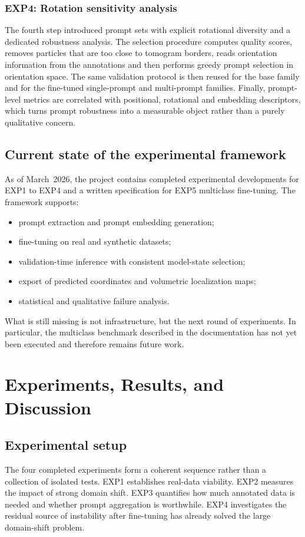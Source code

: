 \documentclass[12pt,a4paper]{report}
\begin{document}
\subsection{EXP4: Rotation sensitivity analysis}
The fourth step introduced prompt sets with explicit rotational diversity and a dedicated robustness analysis. The selection procedure computes quality scores, removes particles that are too close to tomogram borders, reads orientation information from the annotations and then performs greedy prompt selection in orientation space. The same validation protocol is then reused for the base family and for the fine-tuned single-prompt and multi-prompt families. Finally, prompt-level metrics are correlated with positional, rotational and embedding descriptors, which turns prompt robustness into a measurable object rather than a purely qualitative concern.

\section{Current state of the experimental framework}
As of March~2026, the project contains completed experimental developments for EXP1 to EXP4 and a written specification for EXP5 multiclass fine-tuning. The framework supports:
\begin{itemize}
  \item prompt extraction and prompt embedding generation;
  \item fine-tuning on real and synthetic datasets;
  \item validation-time inference with consistent model-state selection;
  \item export of predicted coordinates and volumetric localization maps;
  \item statistical and qualitative failure analysis.
\end{itemize}

What is still missing is not infrastructure, but the next round of experiments. In particular, the multiclass benchmark described in the documentation has not yet been executed and therefore remains future work.

\chapter{Experiments, Results, and Discussion}

\section{Experimental setup}
The four completed experiments form a coherent sequence rather than a collection of isolated tests. EXP1 establishes real-data viability. EXP2 measures the impact of strong domain shift. EXP3 quantifies how much annotated data is needed and whether prompt aggregation is worthwhile. EXP4 investigates the residual source of instability after fine-tuning has already solved the large domain-shift problem.
\end{document}
